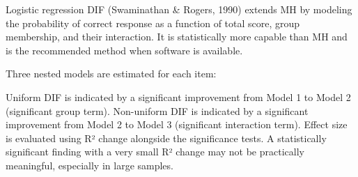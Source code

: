 \documentclass[
  11pt,
  letterpaper,
]{scrbook}
\begin{document}
Logistic regression DIF (Swaminathan \& Rogers, 1990) extends MH by
modeling the probability of correct response as a function of total
score, group membership, and their interaction. It is statistically more
capable than MH and is the recommended method when software is
available.

Three nested models are estimated for each item:

\begin{table}

\caption{\label{tbl-lr-models}The three nested logistic regression
models used in LR DIF analysis.}


\end{table}%

Uniform DIF is indicated by a significant improvement from Model 1 to
Model 2 (significant group term). Non-uniform DIF is indicated by a
significant improvement from Model 2 to Model 3 (significant interaction
term). Effect size is evaluated using R² change alongside the
significance tests. A statistically significant finding with a very
small R² change may not be practically meaningful, especially in large
samples.
\end{document}

